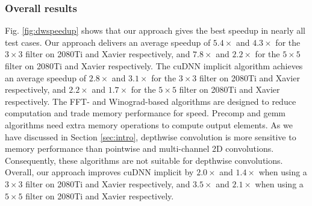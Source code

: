 
\subsubsection{Overall results}
 Fig. \ref{fig:dwspeedup} shows that our approach gives the best speedup in nearly all test cases. Our
approach delivers an average speedup of $5.4\times$ and $4.3\times$ for the $3 \times 3$ filter on 2080Ti and Xavier respectively, and
$7.8\times$ and $2.2\times$ for the $5 \times 5$ filter on 2080Ti and Xavier respectively. The cuDNN implicit algorithm achieves an average
speedup of $2.8\times$ and $3.1\times$ for the $3 \times 3$ filter on 2080Ti and Xavier respectively, and $2.2\times$ and $1.7\times$ for
the $5 \times 5$ filter on 2080Ti and Xavier respectively. %
The FFT- and Winograd-based algorithms are designed to reduce computation and trade memory performance for speed. Precomp and gemm
algorithms need extra memory operations to compute output elements. As we have discussed in Section \ref{sec:intro}, depthwise convolution
is more sensitive to memory performance than pointwise and multi-channel 2D convolutions. Consequently, these algorithms are not suitable
for depthwise convolutions. Overall, our approach improves cuDNN implicit by $2.0\times$ and $1.4\times$ when using a $3 \times 3$  filter
on 2080Ti and Xavier respectively, and $3.5\times$ and $2.1\times$ when using a $5 \times 5$ filter on 2080Ti and Xavier respectively.

